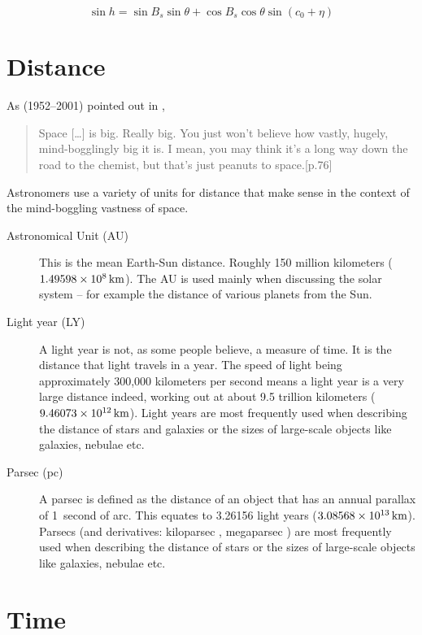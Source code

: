 \begin{equation}
\sin h=\sin B_s \sin\theta + \cos B_s \cos\theta \sin(c_0+\eta)
\end{equation}



\section{Distance}
\label{sec:Concepts:Distance}

As  (1952--2001) pointed out in ,
\begin{quote}
  Space [\ldots] is big. Really big. You just won't believe how vastly, hugely,
  mind-bogglingly big it is. I mean, you may think it's a long way
  down the road to the chemist, but that's just peanuts to
  space.[p.76]
\end{quote}
%
Astronomers use a variety of units for distance that make sense in the
context of the mind-boggling vastness of space.

\begin{description}
\item[Astronomical Unit (AU)] This is the mean Earth-Sun
  distance. Roughly 150 million kilometers
  ($1.49598 \times 10^8\,\mathrm{km}$). The AU is used mainly when
  discussing the solar system -- for example the distance of various
  planets from the Sun.
\item[Light year (LY)] A light year is not, as some people believe, a
  measure of time. It is the distance that light travels in a
  year. The speed of light being approximately 300,000 kilometers per
  second means a light year is a very large distance indeed, working
  out at about 9.5 trillion kilometers
  ($9.46073\times10^{12}\,\mathrm{km}$). Light years are most frequently used
  when describing the distance of stars and galaxies or the sizes of
  large-scale objects like galaxies, nebulae etc.
\item[Parsec (pc)] A parsec is defined as the distance of an object
  that has an annual parallax of 1~second of arc. This equates to
  3.26156 light years ($3.08568\times10^{13}\,\mathrm{km}$). Parsecs (and derivatives: kiloparsec \kpc, megaparsec \Mpc) are most
  frequently used when describing the distance of stars or the sizes
  of large-scale objects like galaxies, nebulae etc.
\end{description}

\section{Time}
\label{sec:Concepts:Time}

